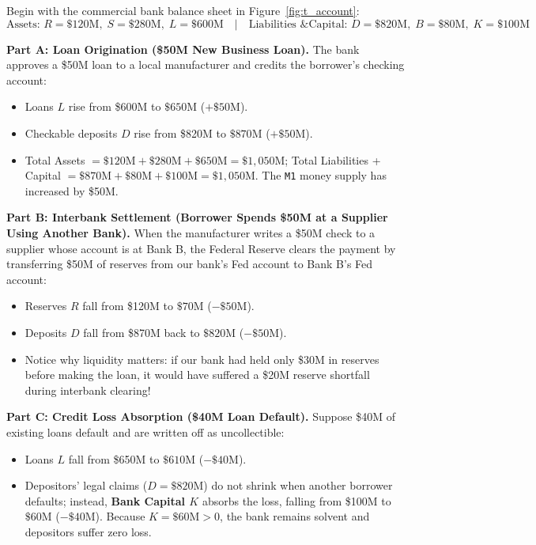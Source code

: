 \documentclass[11pt, oneside]{book}
\begin{document}
\begin{workitout}
Begin with the commercial bank balance sheet in Figure~\ref{fig:t_account}:
\[
  \text{Assets: } R = \$120\text{M},\; S = \$280\text{M},\; L = \$600\text{M} \quad|\quad
  \text{Liabilities \& Capital: } D = \$820\text{M},\; B = \$80\text{M},\; K = \$100\text{M}
\]

\textbf{Part A: Loan Origination (\$50M New Business Loan).}
The bank approves a \$50M loan to a local manufacturer and credits the borrower's checking account:
\begin{itemize}[leftmargin=1.5em, itemsep=2pt]
  \item Loans $L$ rise from \$600M to $\$650\text{M}$ ($+\$50\text{M}$).
  \item Checkable deposits $D$ rise from \$820M to $\$870\text{M}$ ($+\$50\text{M}$).
  \item Total Assets $= \$120\text{M} + \$280\text{M} + \$650\text{M} = \$1{,}050\text{M}$; Total Liabilities + Capital $= \$870\text{M} + \$80\text{M} + \$100\text{M} = \$1{,}050\text{M}$. The \texttt{M1} money supply has increased by \$50M.
\end{itemize}

\textbf{Part B: Interbank Settlement (Borrower Spends \$50M at a Supplier Using Another Bank).}
When the manufacturer writes a \$50M check to a supplier whose account is at Bank B, the Federal Reserve clears the payment by transferring \$50M of reserves from our bank's Fed account to Bank B's Fed account:
\begin{itemize}[leftmargin=1.5em, itemsep=2pt]
  \item Reserves $R$ fall from \$120M to $\$70\text{M}$ ($-\$50\text{M}$).
  \item Deposits $D$ fall from \$870M back to $\$820\text{M}$ ($-\$50\text{M}$).
  \item Notice why liquidity matters: if our bank had held only \$30M in reserves before making the loan, it would have suffered a \$20M reserve shortfall during interbank clearing!
\end{itemize}

\textbf{Part C: Credit Loss Absorption (\$40M Loan Default).}
Suppose \$40M of existing loans default and are written off as uncollectible:
\begin{itemize}[leftmargin=1.5em, itemsep=2pt]
  \item Loans $L$ fall from \$650M to $\$610\text{M}$ ($-\$40\text{M}$).
  \item Depositors' legal claims ($D = \$820\text{M}$) do not shrink when another borrower defaults; instead, \textbf{Bank Capital $K$} absorbs the loss, falling from \$100M to $\$60\text{M}$ ($-\$40\text{M}$). Because $K = \$60\text{M} > 0$, the bank remains solvent and depositors suffer zero loss.
\end{itemize}
\end{workitout}
\end{document}
